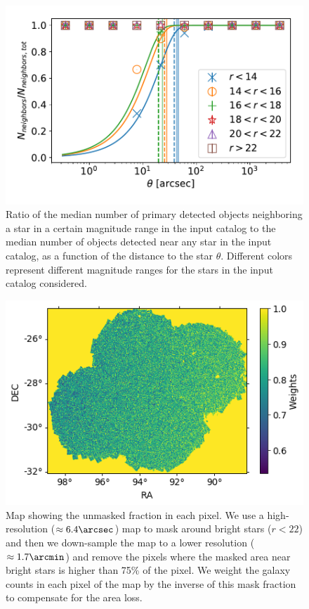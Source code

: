 \documentclass[\docopts]{\docclass}
\begin{document}
\begin{figure}
\centering
\includegraphics[width=0.9\columnwidth]{bright_object_masking}
\caption{Ratio of the median number of primary detected objects neighboring a star in a certain magnitude range in the input catalog to the median number of objects detected near any star in the input catalog, as a function of the distance to the star $\theta$. Different colors represent different magnitude ranges for the stars in the input catalog considered.}
\label{fig:bright_object_masking}
\end{figure}
\begin{figure}
\centering
\includegraphics[width=0.9\columnwidth]{bo_mask}
\caption{Map showing the unmasked fraction in each pixel. We use a high-resolution ($\approx 6.4 \arcsec$) map to mask around bright stars ($r < 22$) and then we down-sample the map to a lower resolution ($\approx 1.7 \arcmin$) and remove the pixels where the masked area near bright stars is higher than 75\% of the pixel. We weight the galaxy counts in each pixel of the map by the inverse of this mask fraction to compensate for the area loss.}
\label{fig:bo_mask}
\end{figure} 
\end{document}
